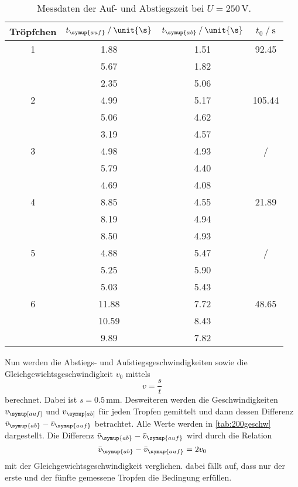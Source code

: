 \begin{table}
    \centering
    \caption{Messdaten der Auf- und Abstiegszeit bei $U=250\,\unit{\V}$.}
\begin{tabular}{c c c c}
    \toprule
        Tröpfchen &$t_{\symup{auf}} \mathbin{/} \unit{\s}$ & $t_{\symup{ab}}\mathbin{/} \unit{\s}$ & $t_0 \mathbin{/}\unit{\s}$ \\
    \midrule
    1&1.88&1.51&92.45 \\
    &5.67&1.82& \\
    &2.35&5.06& \\
2&4.99&5.17&105.44 \\
    &5.06&4.62& \\
    &3.19&4.57& \\
  3&4.98&4.93&/ \\
     &5.79&4.40& \\
    &4.69&4.08& \\
4&8.85&4.55&21.89 \\
    &8.19&4.94& \\
     &8.50&4.93& \\
  5&4.88&5.47&/ \\
     &5.25&5.90& \\
    &5.03&5.43& \\
6&11.88&7.72&48.65 \\
   &10.59&8.43& \\
    &9.89&7.82& \\
    \bottomrule
    \end{tabular}
    \label{tab:250}
\end{table}

\newpage
Nun werden die Abstiegs- und Aufstiegsgeschwindigkeiten sowie die Gleichgewichtsgeschwindigkeit $v_0$ mittels
\begin{equation*}
    v=\frac{s}{t}
\end{equation*} 
berechnet. Dabei ist $s=0.5\,\unit{\milli\m}$. Desweiteren werden die Geschwindigkeiten $v_{\symup[auf]}$ und $v_{\symup[ab]}$ für jeden Tropfen gemittelt und dann
dessen Differenz $\bar{v}_{\symup{ab}}-\bar{v}_{\symup{auf}}$ betrachtet. Alle Werte werden in \autoref{tab:200geschw} dargestellt. 
Die Differenz $\bar{v}_{\symup{ab}}-\bar{v}_{\symup{auf}}$ wird durch die Relation
\begin{equation*}
    \bar{v}_{\symup{ab}}-\bar{v}_{\symup{auf}} = 2v_0
\end{equation*}
mit der Gleichgewichtsgeschwindigkeit verglichen. dabei fällt auf, dass nur der erste und der fünfte gemessene Tropfen die Bedingung erfüllen. 




